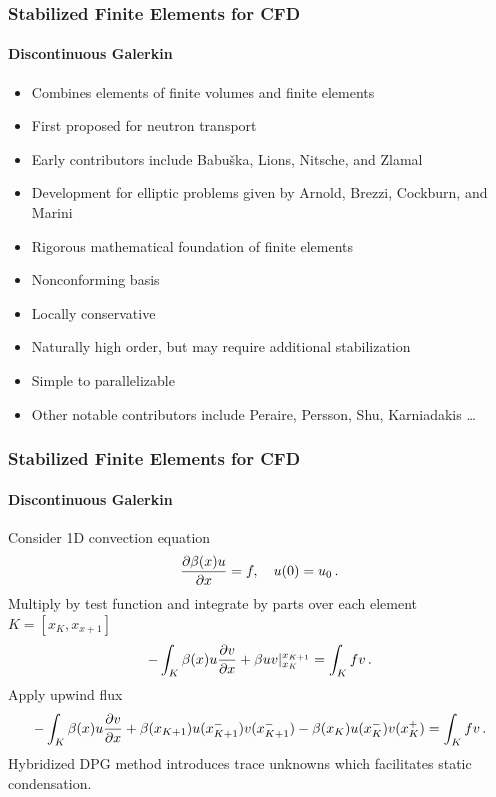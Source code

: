 \documentclass[18pt,xcolor=table]{beamer}
\begin{document}
\begin{frame}[t]
\frametitle{Stabilized Finite Elements for CFD}
\framesubtitle{Discontinuous Galerkin}
\begin{itemize}
  \item Combines elements of finite volumes and finite elements
  \item First proposed for neutron transport
  \item Early contributors include Babu\v{s}ka, Lions, Nitsche, and Zlamal
  \item Development for elliptic problems given by Arnold, Brezzi, Cockburn, and Marini
  \item Rigorous mathematical foundation of finite elements
  \item Nonconforming basis
  \item Locally conservative
  \item Naturally high order, but may require additional stabilization
  \item Simple to parallelizable
  \item Other notable contributors include Peraire, Persson, Shu, Karniadakis \dots
\end{itemize}
\end{frame}


\begin{frame}[t]
\frametitle{Stabilized Finite Elements for CFD}
\framesubtitle{Discontinuous Galerkin}
Consider 1D convection equation
\[
\frac{\partial\beta(x)u}{\partial x}=f,\quad u(0)=u_0\,.
\]
Multiply by test function and integrate by parts over each element $K=[x_K,x_{x+1}]$
\[
-\int_K\beta(x)u\frac{\partial v}{\partial x}+\beta uv|_{x_K}^{x_{K+1}}=\int_K fv\,.
\]
Apply upwind flux
\[
-\int_K\beta(x)u\frac{\partial v}{\partial x}+\beta(x_{K+1})u(x_{K+1}^-)v(x_{K+1}^-)-\beta(x_K)u(x_K^-)v(x_K^+)=\int_K fv\,.
\]
Hybridized DPG method introduces trace unknowns which facilitates static condensation.
\end{frame}
\end{document}
